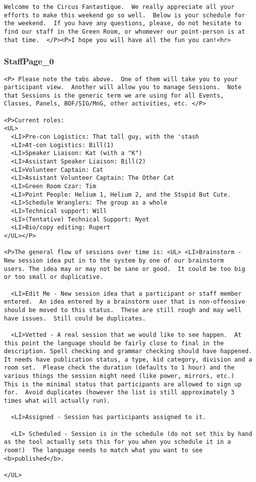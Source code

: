 \documentclass[tablesignature]{scrartcl}
\begin{document}
\begin{verbatim}
Welcome to the Circus Fantastique.  We really appreciate all your
efforts to make this weekend go so well.  Below is your schedule for
the weekend.  If you have any questions, please, do not hesitate to
find our staff in the Green Room, or whomever our point-person is at
that time.  </P><P>I hope you will have all the fun you can!<hr>
\end{verbatim}
\subsubsection{StaffPage\_{}0}
\label{sec-3_5_4}

\begin{verbatim}
<P> Please note the tabs above.  One of them will take you to your
participant view.  Another will allow you to manage Sessions.  Note
that Sessions is the generic term we are using for all Events,
Classes, Panels, BOF/SIG/MnG, other activities, etc. </P>

<P>Current roles:
<UL>
  <LI>Pre-con Logistics: That tall guy, with the 'stash
  <LI>At-con Logistics: Bill(1)
  <LI>Speaker Liaison: Kat (with a "K")
  <LI>Assistant Speaker Liaison: Bill(2)
  <LI>Volunteer Captain: Cat
  <LI>Assistant Volunteer Captain: The Other Cat
  <LI>Green Room Czar: Tim
  <LI>Point People: Helium 1, Helium 2, and the Stupid But Cute.
  <LI>Schedule Wranglers: The group as a whole
  <LI>Technical support: Will
  <LI>(Tentative) Technical Support: Nyot
  <LI>Bio/copy editing: Rupert
</UL></P>

<P>The general flow of sessions over time is: <UL> <LI>Brainstorm -
New session idea put in to the system by one of our brainstorm
users. The idea may or may not be sane or good.  It could be too big
or too small or duplicative.

  <LI>Edit Me - New session idea that a participant or staff member
entered.  An idea entered by a brainstorm user that is non-offensive
should be moved to this status.  These are still rough and may well
have issues.  Still could be duplicates.

  <LI>Vetted - A real session that we would like to see happen.  At
this point the language should be fairly close to final in the
description. Spell checking and grammar checking should have happened.
It needs have publication status, a type, kid category, division and a
room set.  Please check the duration (defaults to 1 hour) and the
various things the session might need (like power, mirrors, etc.)
This is the minimal status that participants are allowed to sign up
for.  Avoid duplicates (however the list is still approximately 3
times what will actually run).

  <LI>Assigned - Session has participants assigned to it.

  <LI> Scheduled - Session is in the schedule (do not set this by hand
as the tool actually sets this for you when you schedule it in a
room!)  The language needs to match what you want to see
<b>published</b>.

</UL>
\end{verbatim}
\end{document}
